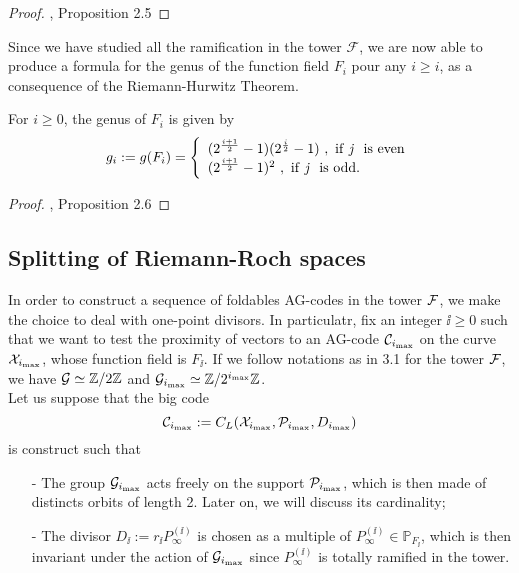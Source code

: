 \documentclass[10pt]{article}
\begin{document}
\s

\begin{proof}
\cite{NOQ}, Proposition 2.5
\end{proof}

\s

Since we have studied all the ramification in the tower $\mathcal{F}$, we are now able to produce a formula for the genus of the function field $F_i$ pour any $i \geq i$, as a consequence of the Riemann-Hurwitz Theorem.

\s

\begin{proposition}
For $i \geq 0$, the genus of $F_i$ is given by 
\begin{equation*}
g_i := g(F_i) = \left\{ \begin{array}{ll}
(2^{\frac{i+1}{2}}-1)(2^{\frac{i}{2}}-1) \ , \ \rm if \ \it j \ \rm \ is \ even \\
(2^{\frac{i+1}{2}}-1)^2 \ , \ \rm if \ \it j \ \rm \ is \ odd.
\end{array}
\right.
\end{equation*}
\end{proposition}

\s

\begin{proof}
\cite{NOQ}, Proposition 2.6
\end{proof}

\s

\subsection{Splitting of Riemann-Roch spaces}

\s

In order to construct a sequence of foldables AG-codes in the tower $\mathcal{F}$, we make the choice to deal with one-point divisors. In particulatr, fix an integer $\ii \geq 0$ such that we want to test the proximity of vectors to an AG-code $\mathcal{C}_{i_{\rm{max}}}$ on the curve $\mathcal{X}_{i_{\rm{max}}}$, whose function field is $F_{\ii}$. If we follow notations as in 3.1 for the tower $\mathcal{F}$, we have $\mathcal{G} \simeq \mathbb{Z}/2\mathbb{Z}$ and $\mathcal{G}_{i_{\rm{max}}} \simeq \mathbb{Z}/2^{i_{\rm{max}}}\mathbb{Z}$. \\ 
Let us suppose that the big code 
\[\mathcal{C}_{i_{\rm{max}}} := C_L(\mathcal{X}_{i_{\rm{max}}},\mathcal{P}_{i_{\rm{max}}},D_{i_{\rm{max}}})\]
is construct such that 
\begin{itemize}
\item[-] The group $\mathcal{G}_{i_{\rm{max}}}$ acts freely on the support $\mathcal{P}_{i_{\rm{max}}}$, which is then made of distincts orbits of length 2. Later on, we will discuss its cardinality; 
\item[-] The divisor $D_{\ii} := r_{\ii}P_{\infty}^{(\ii)}$ is chosen as a multiple of $P_{\infty}^{(\ii)} \in \mathbb{P}_{F_{\ii}}$, which is then invariant under the action of $\mathcal{G}_{i_{\rm{max}}}$ since $P_{\infty}^{(\ii)}$ is totally ramified in the tower.
\end{itemize}
\end{document}
